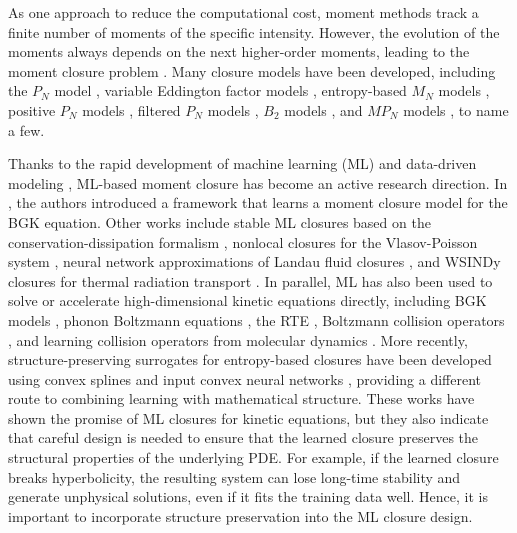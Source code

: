 \documentclass[11pt]{article}
\numberwithin{equation}{section}
\begin{document}
As one approach to reduce the computational cost, moment methods track a finite number of moments of the specific intensity. However, the evolution of the moments always depends on the next higher-order moments, leading to the moment closure problem \cite{grad1949kinetic}. Many closure models have been developed, including the $P_N$ model \cite{chandrasekhar1944radiative}, variable Eddington factor models \cite{levermore1984relating,murchikova2017analytic}, entropy-based $M_N$ models \cite{hauck2011high,alldredge2012high,alldredge2014adaptive}, positive $P_N$ models \cite{hauck2010positive}, filtered $P_N$ models \cite{mcclarren2010robust,laboure2016implicit,radice2013new}, $B_2$ models \cite{alldredge2016approximating}, and $MP_N$ models \cite{fan2020nonlinear,fan2020nonlinear2}, to name a few.


Thanks to the rapid development of machine learning (ML) and data-driven modeling \cite{lecun2015deep,brunton2016discovering,raissi2019physics,han2018solving}, ML-based moment closure has become an active research direction. In \cite{han2019uniformly}, the authors introduced a framework that learns a moment closure model for the BGK equation. Other works include stable ML closures based on the conservation-dissipation formalism \cite{huang2020learning,zhu2015conservation}, nonlocal closures for the Vlasov-Poisson system \cite{bois2020neural}, neural network approximations of Landau fluid closures \cite{ma2020machine,wang2020deep,maulik2020neural}, and WSINDy closures for thermal radiation transport \cite{messenger2025learning}. In parallel, ML has also been used to solve or accelerate high-dimensional kinetic equations directly, including BGK models \cite{lou2020physics}, phonon Boltzmann equations \cite{li2021physics}, the RTE \cite{mishra2020physics}, Boltzmann collision operators \cite{xiao2020using,miller2022neural}, and learning collision operators from molecular dynamics \cite{zhao2025data,zhao2026molecular}. More recently, structure-preserving surrogates for entropy-based closures have been developed using convex splines and input convex neural networks \cite{hauck2021entropy,hauck2021boltzmann,amos2017input,schotthofer2025structure}, providing a different route to combining learning with mathematical structure. These works have shown the promise of ML closures for kinetic equations, but they also indicate that careful design is needed to ensure that the learned closure preserves the structural properties of the underlying PDE. For example, if the learned closure breaks hyperbolicity, the resulting system can lose long-time stability and generate unphysical solutions, even if it fits the training data well. Hence, it is important to incorporate structure preservation into the ML closure design.
\end{document}
